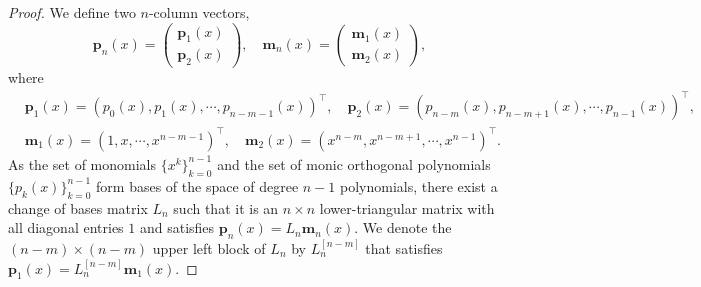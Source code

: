 \documentclass[a4paper,10pt,leqno]{amsart}
\numberwithin{equation}{section}
\theoremstyle{remark}
\begin{document}
\begin{proof}
We define two $n$-column vectors,
\[
\bm p_{n}(x) = \begin{pmatrix}
    \bm p_{1}(x)\\
    \bm p_{2}(x)
\end{pmatrix}, \quad \bm m_{n}(x) = \begin{pmatrix}
    \bm m_{1}(x)\\
    \bm m_{2}(x)
\end{pmatrix},
\]
where
\begin{align}
&\bm p_{1}(x) = \left(p_0(x), p_1(x), \cdots,p_{n-m-1}(x) \right)^\top, \quad \bm p_{2}(x) = \left( p_{n-m}(x), p_{n-m+1}(x), \cdots, p_{n-1}(x) \right)^\top,\\
&\bm m_{1}(x) = \left( 1,x,\cdots,x^{n-m-1} \right)^\top, \quad \bm m_{2}(x) = \left( x^{n-m}, x^{n-m+1}, \cdots, x^{n-1} \right)^\top.
\end{align}
As the set of monomials $\{x^k\}_{k=0}^{n-1}$ and the set of monic orthogonal polynomials $\{ p_k(x)\}_{k=0}^{n-1}$ form bases of the space of degree $n-1$ polynomials, there exist a change of bases matrix $L_{n}$ such that it is an $n \times n$ lower-triangular matrix with all diagonal entries $1$ and satisfies \( \bm{p}_n(x) = L_n \bm m_n(x) \).
We denote the $(n-m) \times (n-m)$ upper left block of $L_{n}$ by $L_{n}^{[n-m]}$ that satisfies \( \bm{p}_{1}(x) = L_n^{[n-m]} \bm m_{1}(x) \).


\end{proof}
\end{document}
